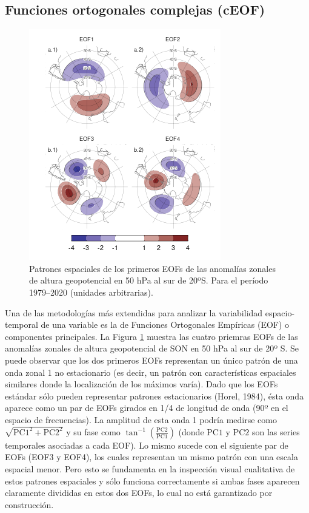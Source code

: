 \documentclass[12pt,oneside]{reedthesis}
\begin{document}
\hypertarget{ceof-metodo}{%
\subsection{Funciones ortogonales complejas (cEOF)}\label{ceof-metodo}}



\begin{figure}
\includegraphics{figures/20-ceofs/eof-naive-1} \caption{Patrones espaciales de los primeros EOFs de las anomalías zonales de altura geopotencial en 50 hPa al sur de 20ºS. Para el período 1979--2020 (unidades arbitrarias).}\label{fig:eof-naive}
\end{figure}

Una de las metodologías más extendidas para analizar la variabilidad espacio-temporal de una variable es la de Funciones Ortogonales Empíricas (EOF) o componentes principales.
La Figura \ref{fig:eof-naive} muestra las cuatro priemras EOFs de las anomalías zonales de altura geopotencial de SON en 50 hPa al sur de 20º S.
Se puede observar que los dos primeros EOFs representan un único patrón de una onda zonal 1 no estacionario (es decir, un patrón con características espaciales similares donde la localización de los máximos varía).
Dado que los EOFs estándar sólo pueden representar patrones estacionarios (Horel, 1984), ésta onda aparece como un par de EOFs girados en 1/4 de longitud de onda (90º en el espacio de frecuencias).
La amplitud de esta onda 1 podría medirse como \(\sqrt{\mathrm{PC1}^2 + \mathrm{PC2}^2}\) y su fase como \(\tan^{-1} \left ( \frac{\mathrm{PC2}}{\mathrm{PC1}} \right )\) (donde \(\mathrm{PC1}\) y \(\mathrm{PC2}\) son las series temporales asociadas a cada EOF).
Lo mismo sucede con el siguiente par de EOFs (EOF3 y EOF4), los cuales representan un mismo patrón con una escala espacial menor.
Pero esto se fundamenta en la inspección visual cualitativa de estos patrones espaciales y sólo funciona correctamente si ambas fases aparecen claramente divididas en estos dos EOFs, lo cual no está garantizado por construcción.
\end{document}
